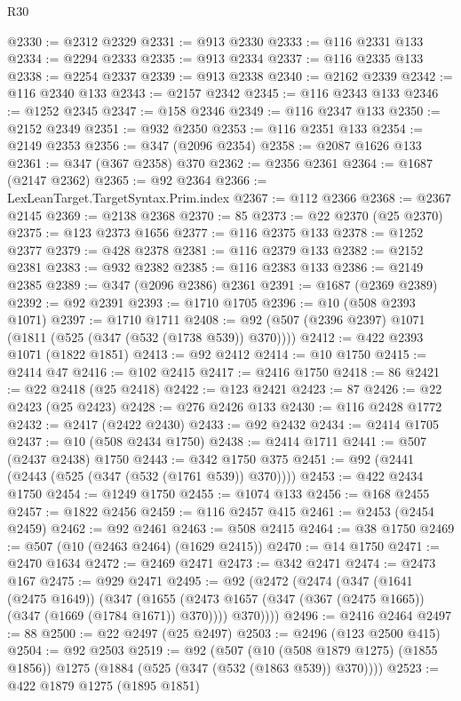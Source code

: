 \begin{lexlean}{R30}
\begin{coremodule}
@2330 := @2312 @2329
@2331 := @913 @2330
@2333 := @116 @2331 @133
@2334 := @2294 @2333
@2335 := @913 @2334
@2337 := @116 @2335 @133
@2338 := @2254 @2337
@2339 := @913 @2338
@2340 := @2162 @2339
@2342 := @116 @2340 @133
@2343 := @2157 @2342
@2345 := @116 @2343 @133
@2346 := @1252 @2345
@2347 := @158 @2346
@2349 := @116 @2347 @133
@2350 := @2152 @2349
@2351 := @932 @2350
@2353 := @116 @2351 @133
@2354 := @2149 @2353
@2356 := @347 (@2096 @2354)
@2358 := @2087 @1626 @133
@2361 := @347 (@367 @2358) @370
@2362 := @2356 @2361
@2364 := @1687 (@2147 @2362)
@2365 := @92 @2364
@2366 := LexLeanTarget.TargetSyntax.Prim.index
@2367 := @112 @2366
@2368 := @2367 @2145
@2369 := @2138 @2368
@2370 := 85
@2373 := @22 @2370 (@25 @2370)
@2375 := @123 @2373 @1656
@2377 := @116 @2375 @133
@2378 := @1252 @2377
@2379 := @428 @2378
@2381 := @116 @2379 @133
@2382 := @2152 @2381
@2383 := @932 @2382
@2385 := @116 @2383 @133
@2386 := @2149 @2385
@2389 := @347 (@2096 @2386) @2361
@2391 := @1687 (@2369 @2389)
@2392 := @92 @2391
@2393 := @1710 @1705
@2396 := @10 (@508 @2393 @1071)
@2397 := @1710 @1711
@2408 := @92 (@507 (@2396 @2397) @1071 (@1811 (@525 (@347 (@532 (@1738 @539)) @370))))
@2412 := @422 @2393 @1071 (@1822 @1851)
@2413 := @92 @2412
@2414 := @10 @1750
@2415 := @2414 @47
@2416 := @102 @2415
@2417 := @2416 @1750
@2418 := 86
@2421 := @22 @2418 (@25 @2418)
@2422 := @123 @2421
@2423 := 87
@2426 := @22 @2423 (@25 @2423)
@2428 := @276 @2426 @133
@2430 := @116 @2428 @1772
@2432 := @2417 (@2422 @2430)
@2433 := @92 @2432
@2434 := @2414 @1705
@2437 := @10 (@508 @2434 @1750)
@2438 := @2414 @1711
@2441 := @507 (@2437 @2438) @1750
@2443 := @342 @1750 @375
@2451 := @92 (@2441 (@2443 (@525 (@347 (@532 (@1761 @539)) @370))))
@2453 := @422 @2434 @1750
@2454 := @1249 @1750
@2455 := @1074 @133
@2456 := @168 @2455
@2457 := @1822 @2456
@2459 := @116 @2457 @415
@2461 := @2453 (@2454 @2459)
@2462 := @92 @2461
@2463 := @508 @2415
@2464 := @38 @1750
@2469 := @507 (@10 (@2463 @2464) (@1629 @2415))
@2470 := @14 @1750
@2471 := @2470 @1634
@2472 := @2469 @2471
@2473 := @342 @2471
@2474 := @2473 @167
@2475 := @929 @2471
@2495 := @92
    (@2472
      (@2474
        (@347
          (@1641 (@2475 @1649))
          (@347
            (@1655 (@2473 @1657 (@347 (@367 (@2475 @1665)) (@347 (@1669 (@1784 @1671)) @370))))
            @370))))
@2496 := @2416 @2464
@2497 := 88
@2500 := @22 @2497 (@25 @2497)
@2503 := @2496 (@123 @2500 @415)
@2504 := @92 @2503
@2519 := @92
    (@507
      (@10 (@508 @1879 @1275) (@1855 @1856))
      @1275
      (@1884 (@525 (@347 (@532 (@1863 @539)) @370))))
@2523 := @422 @1879 @1275 (@1895 @1851)

\end{coremodule}
\end{lexlean}
